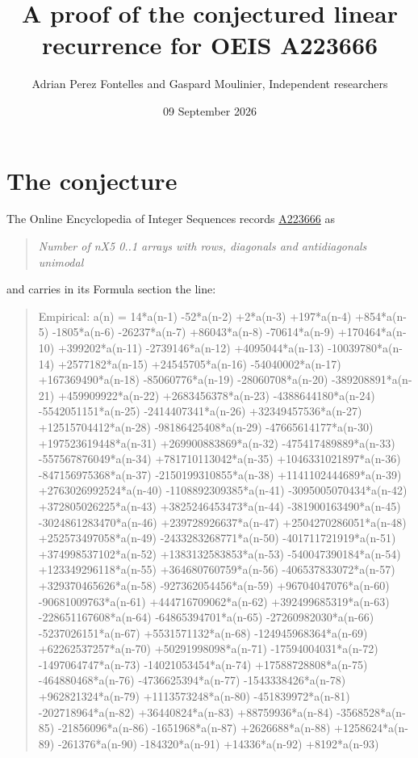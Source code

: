 \documentclass[11pt]{article}
\title{A proof of the conjectured linear recurrence for OEIS A223666}
\author{Adrian Perez Fontelles and Gaspard Moulinier, Independent researchers}
\date{09 September 2026}
\theoremstyle{definition}
\begin{document}
\maketitle
\section{The conjecture}

The Online Encyclopedia of Integer Sequences records \href{https://oeis.org/A223666}{A223666} as

\begin{quote}\itshape Number of nX5 0..1 arrays with rows, diagonals and antidiagonals unimodal\end{quote}

and carries in its Formula section the line:

\begin{quote}\ttfamily Empirical: a(n) = 14*a(n-1) -52*a(n-2) +2*a(n-3) +197*a(n-4) +854*a(n-5) -1805*a(n-6) -26237*a(n-7) +86043*a(n-8) -70614*a(n-9) +170464*a(n-10) +399202*a(n-11) -2739146*a(n-12) +4095044*a(n-13) -10039780*a(n-14) +2577182*a(n-15) +24545705*a(n-16) -54040002*a(n-17) +167369490*a(n-18) -85060776*a(n-19) -28060708*a(n-20) -389208891*a(n-21) +459909922*a(n-22) +2683456378*a(n-23) -4388644180*a(n-24) -5542051151*a(n-25) -2414407341*a(n-26) +32349457536*a(n-27) +12515704412*a(n-28) -98186425408*a(n-29) -47665614177*a(n-30) +197523619448*a(n-31) +269900883869*a(n-32) -475417489889*a(n-33) -557567876049*a(n-34) +781710113042*a(n-35) +1046331021897*a(n-36) -847156975368*a(n-37) -2150199310855*a(n-38) +1141102444689*a(n-39) +2763026992524*a(n-40) -1108892309385*a(n-41) -3095005070434*a(n-42) +372805026225*a(n-43) +3825246453473*a(n-44) -381900163490*a(n-45) -3024861283470*a(n-46) +239728926637*a(n-47) +2504270286051*a(n-48) +252573497058*a(n-49) -2433283268771*a(n-50) -401711721919*a(n-51) +374998537102*a(n-52) +1383132583853*a(n-53) -540047390184*a(n-54) +123349296118*a(n-55) +364680760759*a(n-56) -406537833072*a(n-57) +329370465626*a(n-58) -927362054456*a(n-59) +96704047076*a(n-60) -90681009763*a(n-61) +444716709062*a(n-62) +392499685319*a(n-63) -228651167608*a(n-64) -64865394701*a(n-65) -27260982030*a(n-66) -5237026151*a(n-67) +5531571132*a(n-68) -124945968364*a(n-69) +62262537257*a(n-70) +50291998098*a(n-71) -17594004031*a(n-72) -1497064747*a(n-73) -14021053454*a(n-74) +17588728808*a(n-75) -464880468*a(n-76) -4736625394*a(n-77) -1543338426*a(n-78) +962821324*a(n-79) +1113573248*a(n-80) -451839972*a(n-81) -202718964*a(n-82) +36440824*a(n-83) +88759936*a(n-84) -3568528*a(n-85) -21856096*a(n-86) -1651968*a(n-87) +2626688*a(n-88) +1258624*a(n-89) -261376*a(n-90) -184320*a(n-91) +14336*a(n-92) +8192*a(n-93)\end{quote}
\end{document}
